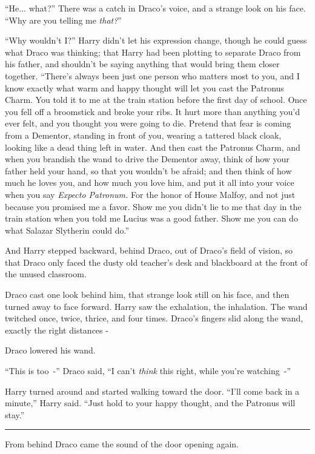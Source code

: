 ``He... what?'' There was a catch in Draco's voice, and a strange look on his face. ``Why are you telling me \emph{that?}''

``Why wouldn't I?'' Harry didn't let his expression change, though he could guess what Draco was thinking; that Harry had been plotting to separate Draco from his father, and shouldn't be saying anything that would bring them closer together. ``There's always been just one person who matters most to you, and I know exactly what warm and happy thought will let you cast the Patronus Charm. You told it to me at the train station before the first day of school. Once you fell off a broomstick and broke your ribs. It hurt more than anything you'd ever felt, and you thought you were going to die. Pretend that fear is coming from a Dementor, standing in front of you, wearing a tattered black cloak, looking like a dead thing left in water. And then cast the Patronus Charm, and when you brandish the wand to drive the Dementor away, think of how your father held your hand, so that you wouldn't be afraid; and then think of how much he loves you, and how much you love him, and put it all into your voice when you say \emph{Expecto Patronum.} For the honor of House Malfoy, and not just because you promised me a favor. Show me you didn't lie to me that day in the train station when you told me Lucius was a good father. Show me you can do what Salazar Slytherin could do.''

And Harry stepped backward, behind Draco, out of Draco's field of vision, so that Draco only faced the dusty old teacher's desk and blackboard at the front of the unused classroom.

Draco cast one look behind him, that strange look still on his face, and then turned away to face forward. Harry saw the exhalation, the inhalation. The wand twitched once, twice, thrice, and four times. Draco's fingers slid along the wand, exactly the right distances -

Draco lowered his wand.

``This is too~-'' Draco said, ``I can't \emph{think} this right, while you're watching~-''

Harry turned around and started walking toward the door. ``I'll come back in a minute,'' Harry said. ``Just hold to your happy thought, and the Patronus will stay.''

\begin{center}\rule{3in}{0.4pt}\end{center}

From behind Draco came the sound of the door opening again.

